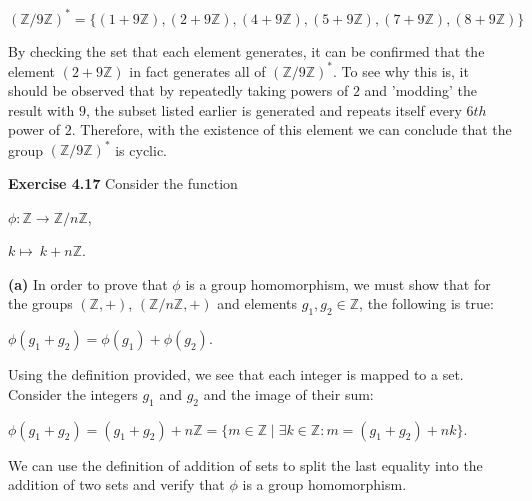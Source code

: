 \documentclass[12pt, a4paper]{article}
\begin{document}
\begin{flushleft}
\vspace{6mm}
\centerline{$(\mathbb{Z}/9\mathbb{Z})^{*}=\{(1+9\mathbb{Z}), (2+9\mathbb{Z}), (4+9\mathbb{Z}), (5+9\mathbb{Z}), (7+9\mathbb{Z}), (8+9\mathbb{Z})\}$}\hfil
\vspace{2mm}

\begin{flushleft}
By checking the set that each element generates, it can be confirmed that the element $(2+9\mathbb{Z})$ in fact generates all of $(\mathbb{Z}/9\mathbb{Z})^{*}$. To see why this is, it should be observed that by repeatedly taking powers of $2$ and 'modding' the result with $9$, the subset listed earlier is generated and repeats itself every $6th$ power of $2$. Therefore, with the existence of this element we can conclude that the group $(\mathbb{Z}/9\mathbb{Z})^{*}$ is cyclic.
\end{flushleft}
\vspace{6mm}

\hspace{2mm}\textbf{Exercise 4.17} Consider the function\hfil
\vspace{12mm}

\centerline{$\phi\colon\mathbb{Z}\rightarrow\mathbb{Z}/n\mathbb{Z}$,}\hfil

\vspace{0.2mm}
\hspace{66mm}$k\mapsto\ k+n\mathbb{Z}$.

\vspace{8mm}
\hspace{2mm}\textbf{(a)} In order to prove that $\phi$ is a group homomorphism, we must show that for the groups $(\mathbb{Z}, +)$, $(\mathbb{Z}/n\mathbb{Z}, +)$ and elements $g_1,g_2\in \mathbb{Z}$, the following is true:\hfil
\vspace{10mm}

\centerline{$\phi(g_1+ g_2)=\phi(g_1)+\phi(g_2)$.}

\vspace{6mm}
\begin{flushleft}
Using the definition provided, we see that each integer is mapped to a set. Consider the integers $g_1$ and $g_2$ and the image of their sum:\hfil
\end{flushleft}
\vspace{10mm}

\centerline{$\phi(g_1+g_2)=(g_1+g_2)+n\mathbb{Z}=\{m\in\mathbb{Z}\mid \exists k\in\mathbb{Z}\colon m=(g_1+g_2)+nk\}$.}

\vspace{10mm}
\begin{flushleft}
We can use the definition of addition of sets to split the last equality into the addition of two sets and verify that $\phi$ is a group homomorphism.
\end{flushleft}
\vspace{25mm}


\end{flushleft}
\end{document}
